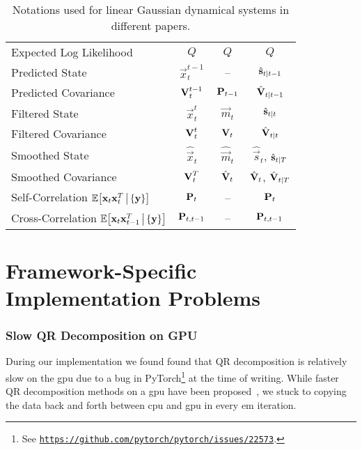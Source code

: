 \begin{table}[ht]
\begin{tabular}{l|ccc}
				Expected Log Likelihood      & \( Q \)                         & \( Q \)                 & \( Q \)                                                    \\
				Predicted State              & \( \vec{x}_t^{t - 1} \)         & --                      & \( \hat{\boldsymbol{\mathrm{s}}}_{t \vert t - 1} \)                    \\
				Predicted Covariance         & \( \boldsymbol{\mathrm{V}}_t^{t - 1} \)         & \( \boldsymbol{\mathrm{P}}_{t - 1} \)   & \( \hat{\boldsymbol{\mathrm{V}}}_{t \vert t - 1} \)                    \\
				Filtered State               & \( \vec{x}_t^t \)               & \( \vec{m}_t \)         & \( \hat{\boldsymbol{\mathrm{s}}}_{t \vert t} \)                        \\
				Filtered Covariance          & \( \boldsymbol{\mathrm{V}}_t^t \)               & \( \boldsymbol{\mathrm{V}}_t \)         & \( \hat{\boldsymbol{\mathrm{V}}}_{t \vert t} \)                        \\
				Smoothed State               & \( \hat{\vec{x}}_t \)           & \( \hat{\vec{m}}_t \)   & \( \hat{\vec{s}}_t \), \( \hat{\boldsymbol{\mathrm{s}}}_{t \vert T} \) \\
				Smoothed Covariance          & \( \boldsymbol{\mathrm{V}}_t^T \)               & \( \hat{\boldsymbol{\mathrm{V}}}_t \)   & \( \hat{\boldsymbol{\mathrm{V}}}_t \), \( \hat{\boldsymbol{\mathrm{V}}}_{t \vert T} \) \\
				Self-Correlation \( \mathbb{E}\big[\boldsymbol{\mathrm{x}}_t \boldsymbol{\mathrm{x}}_t^T \,\big\vert\, \{ \boldsymbol{\mathrm{y}} \}\big] \)
				                             & \( \boldsymbol{\mathrm{P}}_t \)                 & --                      & \( \boldsymbol{\mathrm{P}}_t \)                                            \\
				Cross-Correlation \( \mathbb{E}\big[\boldsymbol{\mathrm{x}}_t \boldsymbol{\mathrm{x}}_{t-1}^T \,\big\vert\, \{ \boldsymbol{\mathrm{y}} \}\big] \)
				                             & \( \boldsymbol{\mathrm{P}}_{t, t - 1} \)        & --                      & \( \boldsymbol{\mathrm{P}}_{t, t - 1} \)
			\end{tabular}
			\caption[Notations used for linear Gaussian dynamical systems in different papers]{Notations used for linear Gaussian dynamical systems in different papers.}
		\end{table}

	\section{Framework-Specific Implementation Problems}
		\label{app:implFrameworkProblems}

		\subsubsection{Slow QR Decomposition on GPU}
			During our implementation we found found that QR decomposition is relatively slow on the \ac{gpu} due to a bug in PyTorch\footnote{See \href{https://web.archive.org/web/20201110121407/https://github.com/pytorch/pytorch/issues/22573}{\texttt{https://github.com/pytorch/pytorch/issues/22573}}.} at the time of writing. While faster QR decomposition methods on a \ac{gpu} have been proposed~\cite{andersonCommunicationAvoidingQRDecomposition2011a}, we stuck to copying the data back and forth between \ac{cpu} and \ac{gpu} in every \ac{em} iteration.

